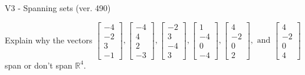 \begin{exercise}
  \begin{exerciseTitle}V3 - Spanning sets (ver. 490)\end{exerciseTitle}
  \begin{exerciseStatement}
    Explain why the vectors \(\left[\begin{array}{r}
-4 \\
-2 \\
3 \\
-1
\end{array}\right] , \left[\begin{array}{r}
-4 \\
4 \\
2 \\
-3
\end{array}\right] , \left[\begin{array}{r}
-2 \\
3 \\
-4 \\
3
\end{array}\right] , \left[\begin{array}{r}
1 \\
-4 \\
0 \\
-4
\end{array}\right] , \left[\begin{array}{r}
4 \\
-2 \\
0 \\
2
\end{array}\right] , \text{ and } \left[\begin{array}{r}
4 \\
-2 \\
0 \\
4
\end{array}\right]\) span or don't span \(\mathbb{R}^4\). 
	



\end{exerciseStatement}
\end{exercise}
